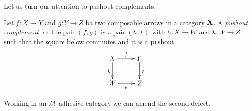 \documentclass[a4paper,UKenglish,cleveref,pdftex, thm-restate,numberwithinsect]{lipics}
\newcommand{\id}[1]{\mathsf{id}_{#1}}
\def\X{\textbf {\textup{X}}}
\def\Set{\textbf {\textup{Set}}}
\begin{document}
Let us turn our attention to pushout complements.

\begin{definition}
Let $f\colon X\to Y$ and $g\colon Y\to Z$ ba two composable arrows in a category $\X$. A \emph{pushout complement} for the pair $(f,g)$ is a pair $(h,k)$ with $h\colon X\to W$ and $k\colon W\to Z$ such that the square below commutes and it is a pushout.
\[\xymatrix{X \ar[r]^{f} \ar[d]_{h}& Y \ar[d]^{g} \\ W \ar[r]_{k}& Z}\]
\end{definition}
\iffalse 
\begin{example}
	In a generic category $\X$, pushout complements may not exist: in $\Set$ the arrows $?_{2}\colon \emptyset \to 2$ and $!_2\colon 2\to 1$ do not have a pushout complement.
	
	Moreover, composable arrows $f\colon X\to Y$ and $g\colon Y\to Z$ may have  pushout complements which are non-isomorphic: for instance, in $\Set$ the two squares below are both pushouts.
	
	\[\xymatrix{2 \ar[r]^{!_2} \ar[d]_{\id{2}}& 1 \ar[d]^{\id{1}} & 2 \ar[r]^{!_2} \ar[d]_{!_2}& 1 \ar[d]^{\id{1}}\\ 2 \ar[r]_{!_2}& 1 & 1 \ar[r]_{\id{1}}& 1}\]
\end{example}
\fi 

Working in an $\mathcal{M}$-adhesive category we can amend the second defect. 
\end{document}
